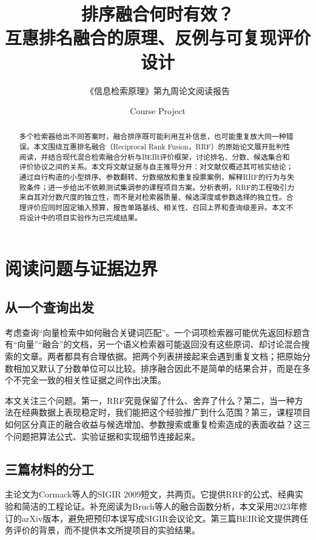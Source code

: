 \documentclass[sigconf,nonacm]{acmart}
\begin{document}
\title{排序融合何时有效？\\互惠排名融合的原理、反例与可复现评价设计}
\subtitle{《信息检索原理》第九周论文阅读报告}
\author{Course Project}
\renewcommand{\shortauthors}{Course Project}
\begin{abstract}
多个检索器给出不同答案时，融合排序既可能利用互补信息，也可能重复放大同一种错误。本文围绕互惠排名融合（Reciprocal Rank Fusion，RRF）的原始论文展开批判性阅读，并结合现代混合检索融合分析与BEIR评价框架，讨论排名、分数、候选集合和评价协议之间的关系。本文将文献证据与自主推导分开：对文献仅概述其可核实结论；通过自行构造的小型排序、参数翻转、分数缩放和重复投票案例，解释RRF的行为与失败条件；进一步给出不依赖测试集调参的课程项目方案。分析表明，RRF的工程吸引力来自其对分数尺度的独立性，而不是对检索器质量、候选深度或参数选择的独立性。合理评价应同时固定输入预算，报告单路基线、相关性、召回上界和查询级差异。本文不将设计中的项目实验作为已完成结果。
\end{abstract}
\maketitle

\section{阅读问题与证据边界}
\subsection{从一个查询出发}
考虑查询“向量检索中如何融合关键词匹配”。一个词项检索器可能优先返回标题含有“向量”“融合”的文档，另一个语义检索器可能返回没有这些原词、却讨论混合搜索的文章。两者都具有合理依据。把两个列表拼接起来会遇到重复文档；把原始分数相加又默认了分数单位可以比较。排序融合因此不是简单的结果合并，而是在多个不完全一致的相关性证据之间作出决策。

本文关注三个问题。第一，RRF究竟保留了什么、舍弃了什么？第二，当一种方法在经典数据上表现稳定时，我们能把这个经验推广到什么范围？第三，课程项目如何区分真正的融合收益与候选增加、参数搜索或重复检索造成的表面收益？这三个问题把算法公式、实验证据和实现细节连接起来。

\subsection{三篇材料的分工}
主论文为Cormack等人的SIGIR 2009短文\cite{cormack2009rrf}，共两页。它提供RRF的公式、经典实验和简洁的工程论证。补充阅读为Bruch等人的融合函数分析\cite{bruch2023analysis}，本文采用2023年修订的arXiv版本，避免把预印本误写成SIGIR会议论文。第三篇BEIR论文\cite{thakur2021beir}提供跨任务评价的背景，而不提供本文所提项目的实验结果。
\end{document}
